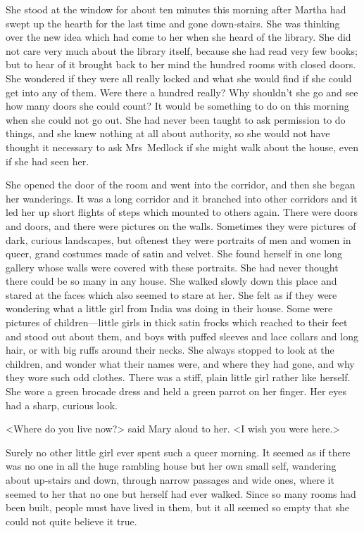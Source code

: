 She stood at the window for about ten minutes this morning after Martha had swept up the hearth for the last time and gone down-stairs. She was thinking over the new idea which had come to her when she heard of the library. She did not care very much about the library itself, because she had read very few books; but to hear of it brought back to her mind the hundred rooms with closed doors. She wondered if they were all really locked and what she would find if she could get into any of them. Were there a hundred really? Why shouldn't she go and see how many doors she could count? It would be something to do on this morning when she could not go out. She had never been taught to ask permission to do things, and she knew nothing at all about authority, so she would not have thought it necessary to ask Mrs~Medlock if she might walk about the house, even if she had seen her.

She opened the door of the room and went into the corridor, and then she began her wanderings. It was a long corridor and it branched into other corridors and it led her up short flights of steps which mounted to others again. There were doors and doors, and there were pictures on the walls. Sometimes they were pictures of dark, curious landscapes, but oftenest they were portraits of men and women in queer, grand costumes made of satin and velvet. She found herself in one long gallery whose walls were covered with these portraits. She had never thought there could be so many in any house. She walked slowly down this place and stared at the faces which also seemed to stare at her. She felt as if they were wondering what a little girl from India was doing in their house. Some were pictures of children—little girls in thick satin frocks which reached to their feet and stood out about them, and boys with puffed sleeves and lace collars and long hair, or with big ruffs around their necks. She always stopped to look at the children, and wonder what their names were, and where they had gone, and why they wore such odd clothes. There was a stiff, plain little girl rather like herself. She wore a green brocade dress and held a green parrot on her finger. Her eyes had a sharp, curious look.

<Where do you live now?> said Mary aloud to her. <I wish you were here.>

Surely no other little girl ever spent such a queer morning. It seemed as if there was no one in all the huge rambling house but her own small self, wandering about up-stairs and down, through narrow passages and wide ones, where it seemed to her that no one but herself had ever walked. Since so many rooms had been built, people must have lived in them, but it all seemed so empty that she could not quite believe it true.

